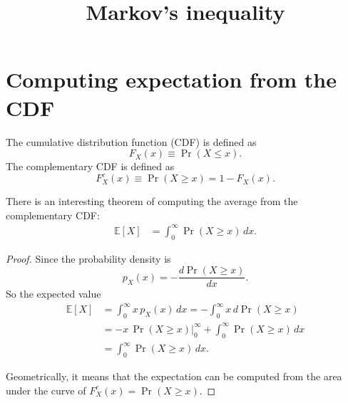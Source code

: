 \documentclass{article}
\begin{document}
\title{Markov's inequality}
\author{ \vspace{-10ex} }
\date{ \vspace{-10ex} }
\maketitle

\section{Computing expectation from the CDF}

The cumulative distribution function (CDF) is defined as
$$
F_X(x) \equiv \Pr(X \le x).
$$
The complementary CDF is defined as
$$
F^c_X(x) \equiv \Pr(X \ge x) = 1 - F_X(x).
$$

There is an interesting theorem of computing the average
from the complementary CDF:
\begin{align}
\mathbb{E}[X] &= \int_0^\infty \Pr(X \ge x) \, dx.
\label{eq:avccdf}
\end{align}

\begin{proof}
Since the probability density is
$$
p_X(x) = - \frac{ d \Pr(X\ge x) }{ d x }.
$$
So the expected value
$$
\begin{aligned}
\mathbb{E}[X] &= \int_0^\infty x \, p_X(x) \, dx
 = -\int_0^\infty x \, d \Pr(X \ge x) \\
 &= -x \, \Pr(X\ge x) \Bigr|_0^\infty
  + \int_0^\infty \Pr(X \ge x) \, dx \\
 &= \int_0^\infty \Pr(X \ge x) \, dx.
\end{aligned}
$$
\begin{figure}[h]
  \centering
\end{figure}
Geometrically, it means that the expectation can be computed from
the area under the curve of $F^c_X(x) = \Pr(X \ge x)$.
\end{proof}
\end{document}
